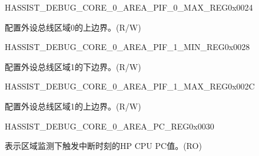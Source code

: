 \begin{register}{H}{ASSIST\_DEBUG\_CORE\_0\_AREA\_PIF\_0\_MAX\_REG}{0x0024}\label{regdesc:ASSISTDEBUGCORE0AREAPIF0MAXREG}
%
\regnewline%
\begin{regdesc}\begin{reglist}
\label{fielddesc:ASSISTDEBUGCORE0AREAPIF0MAX}\item [ASSIST\_DEBUG\_CORE\_0\_AREA\_PIF\_0\_MAX] 配置外设总线区域0的上边界。(R/W)
\end{reglist}\end{regdesc}
\end{register}


\begin{register}{H}{ASSIST\_DEBUG\_CORE\_0\_AREA\_PIF\_1\_MIN\_REG}{0x0028}\label{regdesc:ASSISTDEBUGCORE0AREAPIF1MINREG}
%
\regnewline%
\begin{regdesc}\begin{reglist}
\label{fielddesc:ASSISTDEBUGCORE0AREAPIF1MIN}\item [ASSIST\_DEBUG\_CORE\_0\_AREA\_PIF\_1\_MIN] 配置外设总线区域1的下边界。(R/W)
\end{reglist}\end{regdesc}
\end{register}


\begin{register}{H}{ASSIST\_DEBUG\_CORE\_0\_AREA\_PIF\_1\_MAX\_REG}{0x002C}\label{regdesc:ASSISTDEBUGCORE0AREAPIF1MAXREG}
%
\regnewline%
\begin{regdesc}\begin{reglist}
\label{fielddesc:ASSISTDEBUGCORE0AREAPIF1MAX}\item [ASSIST\_DEBUG\_CORE\_0\_AREA\_PIF\_1\_MAX] 配置外设总线区域1的上边界。(R/W)
\end{reglist}\end{regdesc}
\end{register}


\begin{register}{H}{ASSIST\_DEBUG\_CORE\_0\_AREA\_PC\_REG}{0x0030}\label{regdesc:ASSISTDEBUGCORE0AREAPCREG}
%
\regnewline%
\begin{regdesc}\begin{reglist}
\label{fielddesc:ASSISTDEBUGCORE0AREAPC}\item [ASSIST\_DEBUG\_CORE\_0\_AREA\_PC] 表示区域监测下触发中断时刻的HP CPU PC值。(RO)
\end{reglist}\end{regdesc}
\end{register}



